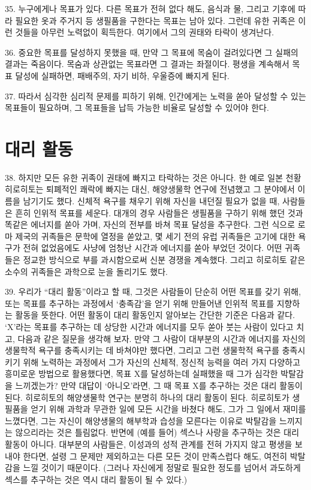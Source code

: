 \documentclass[11pt,a4paper]{article}
\begin{document}
\begin{multicols}{2}
35. 누구에게나 목표가 있다. 다른 목표가 전혀 없다 해도, 음식과 물, 그리고 기후에 따라 필요한 옷과  주거지 등 생필품을 구한다는 목표는 남아 있다. 그런데 유한 귀족은 이런 것들을 아무런 노력없이  획득한다. 여기에서 그의 권태와 타락이 생겨난다. 


36. 중요한 목표를 달성하지 못했을 때, 만약 그 목표에 목숨이 걸려있다면 그 실패의 결과는 죽음이다.  목숨과 상관없는 목표라면 그 결과는 좌절이다. 평생을 계속해서 목표 달성에 실패하면, 패배주의, 자기  비하, 우울증에 빠지게 된다. 


37. 따라서 심각한 심리적 문제를 피하기 위해, 인간에게는 노력을 쏟아 달성할 수 있는 목표들이  필요하며, 그 목표들을 납득 가능한 비율로 달성할 수 있어야 한다. 


\section*{대리 활동} 
38. 하지만 모든 유한 귀족이 권태에 빠지고 타락하는 것은 아니다. 한 예로 일본 천황 히로히토는  퇴폐적인 쾌락에 빠지는 대신, 해양생물학 연구에 전념했고 그 분야에서 이름을 남기기도 했다. 신체적  욕구를 채우기 위해 자신을 내던질 필요가 없을 때, 사람들은 흔히 인위적 목표를 세운다. 대개의 경우  사람들은 생필품을 구하기 위해 했던 것과 똑같은 에너지를 쏟아 가며, 자신의 전부를 바쳐 목표 달성을  추구한다. 그런 식으로 로마 제국의 귀족들은 문학에 열정을 쏟았고, 몇 세기 전의 유럽 귀족들은 고기에  대한 욕구가 전혀 없었음에도 사냥에 엄청난 시간과 에너지를 쏟아 부었던 것이다. 어떤 귀족들은 정교한 
방식으로 부를 과시함으로써 신분 경쟁을 계속했다. 그리고 히로히토 같은 소수의 귀족들은 과학으로  눈을 돌리기도 했다. 


39. 우리가 “대리 활동”이라고 할 때, 그것은 사람들이 단순히 어떤 목표를 갖기 위해, 또는 목표를  추구하는 과정에서 `충족감'을 얻기 위해 만들어낸 인위적 목표를 지향하는 활동을 뜻한다. 어떤 활동이  대리 활동인지 알아보는 간단한 기준은 다음과 같다. ‘X’라는 목표를 추구하는 데 상당한 시간과 에너지를 모두 쏟아 붓는 사람이 있다고 치고, 다음과 같은 질문을 생각해 보자. 만약 그 사람이 대부분의 시간과  에너지를 자신의 생물학적 욕구를 충족시키는 데 바쳐야만 했다면, 그리고 그런 생물학적 욕구를  충족시키기 위해 노력하는 과정에서 그가 자신의 신체적, 정신적 능력을 여러 가지 다양하고 흥미로운  방법으로 활용했다면, 목표 X를 달성하는데 실패했을 때 그가 심각한 박탈감을 느끼겠는가? 만약 대답이  ‘아니오’라면, 그 때 목표 X를 추구하는 것은 대리 활동이 된다. 히로히토의 해양생물학 연구는 분명히  하나의 대리 활동이 된다. 히로히토가 생필품을 얻기 위해 과학과 무관한 일에 모든 시간을 바쳤다 해도,  그가 그 일에서 재미를 느꼈다면, 그는 자신이 해양생물의 해부학과 습성을 모른다는 이유로 박탈감을  느끼지는 않으리라는 것은 틀림없다. 반면에 (예를 들어) 섹스나 사랑을 추구하는 것은 대리 활동이  아니다. 대부분의 사람들은, 이성과의 성적 관계를 전혀 가지지 않고 평생을 보내야 한다면, 설령 그  문제만 제외하고는 다른 모든 것이 만족스럽다 해도, 여전히 박탈감을 느낄 것이기 때문이다. (그러나  자신에게 정말로 필요한 정도를 넘어서 과도하게 섹스를 추구하는 것은 역시 대리 활동이 될 수 있다.) 



\end{multicols}
\end{document}
